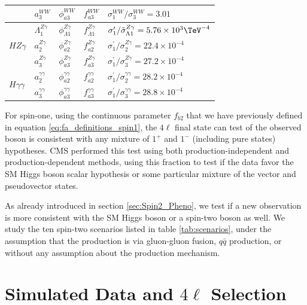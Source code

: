 \begin{table}
\begin{tabular}{lllll}
& $a_3^{WW}$ & $\phi_{a3}^{WW}$ & $f_{a3}^{WW}$ & $\sigma^{WW}_{1}/\sigma^{WW}_{3}=3.01$ \\
\hline
\multirow{3}{*}{$HZ\gamma$} & $\Lambda_{1}^{Z\gamma}$ & $\phi_{\Lambda1}^{Z\gamma}$ & $f_{\Lambda1}^{Z\gamma}$ & $\sigma_{1}^\prime/{\tilde\sigma_{\Lambda1}^{Z\gamma}}=5.76\times 10^{3}\TeV^{-4}$ \\
&$a_2^{Z\gamma}$ & $\phi_{a2}^{Z\gamma}$ & $f_{a2}^{Z\gamma}$ & $\sigma_{1}^\prime/\sigma^{Z\gamma}_{2}=22.4\times10^{-4}$ \\
& $a_3^{Z\gamma}$ & $\phi_{a3}^{Z\gamma}$ & $f_{a3}^{Z\gamma}$ & $\sigma_{1}^\prime/\sigma_{3}^{Z\gamma}=27.2\times10^{-4}$ \\
\hline
\multirow{2}{*}{$H\gamma\gamma$} & $a_2^{\gamma\gamma}$ & $\phi_{a2}^{\gamma\gamma}$ & $f_{a2}^{\gamma\gamma}$  & $\sigma_{1}^\prime/\sigma^{\gamma\gamma}_{2}=28.2\times10^{-4}$ \\
& $a_3^{\gamma\gamma}$ & $\phi_{a3}^{\gamma\gamma}$ & $f_{a3}^{\gamma\gamma}$ & $\sigma_{1}^\prime/\sigma_{3}^{\gamma\gamma}=28.8\times10^{-4}$ \\
\end{tabular}

\end{table}

For spin-one, using the continuous parameter $f_{b2}$ that we have previously defined in equation \eqref{eq:fa_definitions_spin1}, the $4\ell$ final state can test of the observed boson is consistent with any mixture of $1^{+}$ and $1^{-}$ (including pure states) hypotheses. CMS performed this test using both production-independent and production-dependent methods, using this fraction to test if the data favor the SM Higgs boson scalar hypothesis or some particular mixture of the vector and pseudovector states.

As already introduced in section \ref{sec:Spin2_Pheno}, we test if a new observation is more consistent with the SM Higgs boson or a spin-two boson as well. We study the ten spin-two scenarios listed in table \ref{tab:scenarios}, under the assumption that the production is via gluon-gluon fusion, $q\bar{q}$ production, or without any assumption about the production mechanism.

\section{Simulated Data and $4\ell$ Selection}
\label{sec:Spin_Parity_Simulation}

